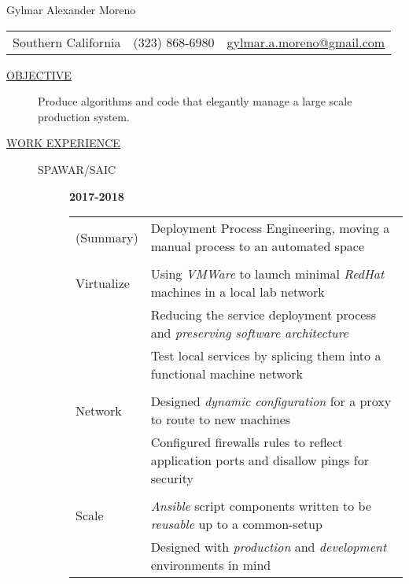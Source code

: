 \documentclass[12pt]{article}
\begin{document}
    \begin{center}
        {\LARGE Gylmar Alexander Moreno}
	\\
        \begin{tabular}{l|l|l}
            Southern California & (323) 868-6980 &
            \href{mailto:gylmar.a.moreno@gmail.com}{gylmar.a.moreno@gmail.com}
        \end{tabular}
    \end{center}

    \begin{description}
        \item[\underline{OBJECTIVE}] Produce algorithms and code that elegantly manage a large scale production system.
            \iffalse Produce algorithms and code that elegantly manage a large scale production system that\fi
        \item[\underline{WORK EXPERIENCE}] \hfill
            \begin{description}
                \item[SPAWAR/SAIC] \hfill \textbf{2017-2018}\\
                    \begin{tabular}{l|l}
			(Summary)  & Deployment Process Engineering, moving a manual process to an automated space\\
				    \\[-1.7mm]
			Virtualize & Using \textit{VMWare} to launch minimal \textit{RedHat} machines in a local lab network\\
				   & Reducing the service deployment process and \textit{preserving software architecture}\\
				   & Test local services by splicing them into a functional machine network\\
				    \\[-1.7mm]
			Network	   & Designed \textit{dynamic configuration} for a proxy to route to new machines\\
				   & Configured firewalls rules to reflect application ports and disallow pings for security\\
				    \\[-1.7mm]
			Scale	   & \textit{Ansible} script components written to be \textit{reusable} up to a common-setup\\
				   & Designed with \textit{production} and \textit{development} environments in mind\\
                    \end{tabular}


\end{description}
\end{description}
\end{document}
